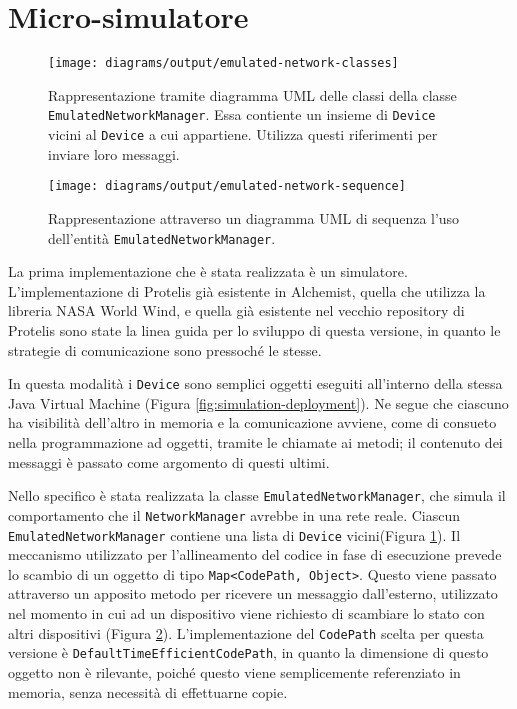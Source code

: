 %
\section{Micro-simulatore}
\begin{figure}
  \centering
  \texttt{[image: diagrams/output/emulated-network-classes]}
  \caption{Rappresentazione tramite diagramma UML delle classi della classe
    \texttt{EmulatedNetworkManager}. Essa contiente un insieme di
    \texttt{Device} vicini al \texttt{Device} a cui appartiene. Utilizza questi
    riferimenti per inviare loro messaggi.}
  \label{fig:emulated-network-classes}
\end{figure}
\begin{figure}
  \centering
  \texttt{[image: diagrams/output/emulated-network-sequence]}
  \caption{Rappresentazione attraverso un diagramma UML di sequenza l'uso
    dell'entità \texttt{EmulatedNetworkManager}.}
    \label{fig:emulated-network-sequence}
\end{figure}
La prima implementazione che è stata realizzata è un simulatore.
L'implementazione di Protelis già esistente in Alchemist, quella che utilizza
la libreria NASA World Wind, e quella già esistente nel vecchio repository di
Protelis sono state la linea guida per lo sviluppo di questa versione, in
quanto le strategie di comunicazione sono pressoché le stesse.

In questa modalità i \texttt{Device} sono semplici oggetti eseguiti all'interno
della stessa Java Virtual Machine (Figura \ref{fig:simulation-deployment}). Ne
segue che ciascuno ha visibilità dell'altro in memoria e la comunicazione
avviene, come di consueto nella programmazione ad oggetti, tramite le chiamate
ai metodi; il contenuto dei messaggi è passato come argomento di questi ultimi.

Nello specifico è stata realizzata la classe \texttt{EmulatedNetworkManager},
che simula il comportamento che il \texttt{NetworkManager} avrebbe in una rete
reale. Ciascun \texttt{EmulatedNetworkManager} contiene una lista di
\texttt{Device} vicini(Figura \ref{fig:emulated-network-classes}). Il meccanismo
utilizzato per l'allineamento del codice in fase di esecuzione prevede lo
scambio di un oggetto di tipo \texttt{Map<CodePath, Object>}.
Questo viene passato attraverso un apposito metodo per ricevere un messaggio
dall'esterno, utilizzato nel momento in cui ad un dispositivo viene richiesto di
scambiare lo stato con altri dispositivi (Figura
\ref{fig:emulated-network-sequence}).
L'implementazione del \texttt{CodePath} scelta per questa versione è
\texttt{DefaultTimeEfficientCodePath}, in quanto la dimensione di questo oggetto
non è rilevante, poiché questo viene semplicemente referenziato in memoria,
senza necessità di effettuarne copie.

